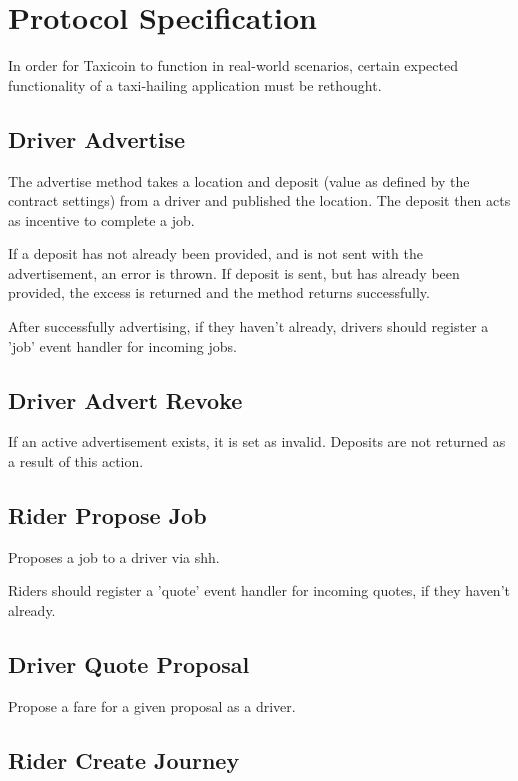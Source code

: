 \section{Protocol Specification}

In order for Taxicoin to function in real-world scenarios, certain expected functionality of a taxi-hailing application must be rethought.

\subsection{Driver Advertise}

The advertise method takes a location and deposit (value as defined by the contract settings) from a driver and published the location.
The deposit then acts as incentive to complete a job.

If a deposit has not already been provided, and is not sent with the advertisement, an error is thrown.
If deposit is sent, but has already been provided, the excess is returned and the method returns successfully.

After successfully advertising, if they haven't already, drivers should register a 'job' event handler for incoming jobs.

\subsection{Driver Advert Revoke}

If an active advertisement exists, it is set as invalid. Deposits are not returned as a result of this action.

\subsection{Rider Propose Job}

Proposes a job to a driver via shh.

Riders should register a 'quote' event handler for incoming quotes, if they haven't already.

\subsection{Driver Quote Proposal}

Propose a fare for a given proposal as a driver.

\subsection{Rider Create Journey}

